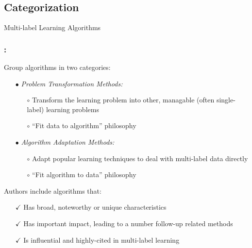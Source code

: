 \documentclass{beamer}
\begin{document}
\subsection{Categorization}
\begin{frame}
\Huge{\centerline{Multi-label Learning Algorithms}}
\end{frame}
\begin{frame}
\frametitle{\insertsection : \insertsubsection}

Group algorithms in two categories:
\begin{itemize}
\item[$\bullet$] \emph{Problem Transformation Methods:}

\begin{itemize}
\item[$\circ$] Transform the learning problem into other, managable (often
  single-label) learning
  problems 
\item[$\circ$] ``Fit data to algorithm'' philosophy
\end{itemize}

\item[$\bullet$] \emph{Algorithm Adaptation Methods:}
\begin{itemize}
\item[$\circ$] Adapt popular learning techniques to deal with multi-label data directly
\item[$\circ$] ``Fit algorithm to data'' philosophy
\end{itemize}
\end{itemize}

Authors include algorithms that:
\begin{itemize}
\item[$\checkmark$] Has broad, noteworthy or unique characteristics
\item[$\checkmark$] Has important impact, leading to a number follow-up related methods
\item[$\checkmark$] Is influential and highly-cited in multi-label learning
\end{itemize}

\end{frame}
\end{document}
